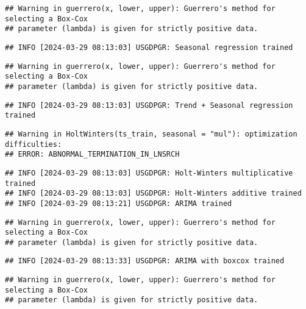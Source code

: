 \documentclass[
]{article}
\begin{document}
\begin{verbatim}
## Warning in guerrero(x, lower, upper): Guerrero's method for selecting a Box-Cox
## parameter (lambda) is given for strictly positive data.
\end{verbatim}

\begin{verbatim}
## INFO [2024-03-29 08:13:03] USGDPGR: Seasonal regression trained
\end{verbatim}

\begin{verbatim}
## Warning in guerrero(x, lower, upper): Guerrero's method for selecting a Box-Cox
## parameter (lambda) is given for strictly positive data.
\end{verbatim}

\begin{verbatim}
## INFO [2024-03-29 08:13:03] USGDPGR: Trend + Seasonal regression trained
\end{verbatim}

\begin{verbatim}
## Warning in HoltWinters(ts_train, seasonal = "mul"): optimization difficulties:
## ERROR: ABNORMAL_TERMINATION_IN_LNSRCH
\end{verbatim}

\begin{verbatim}
## INFO [2024-03-29 08:13:03] USGDPGR: Holt-Winters multiplicative trained
## INFO [2024-03-29 08:13:03] USGDPGR: Holt-Winters additive trained
## INFO [2024-03-29 08:13:21] USGDPGR: ARIMA trained
\end{verbatim}

\begin{verbatim}
## Warning in guerrero(x, lower, upper): Guerrero's method for selecting a Box-Cox
## parameter (lambda) is given for strictly positive data.
\end{verbatim}

\begin{verbatim}
## INFO [2024-03-29 08:13:33] USGDPGR: ARIMA with boxcox trained
\end{verbatim}

\begin{verbatim}
## Warning in guerrero(x, lower, upper): Guerrero's method for selecting a Box-Cox
## parameter (lambda) is given for strictly positive data.
\end{verbatim}
\end{document}
